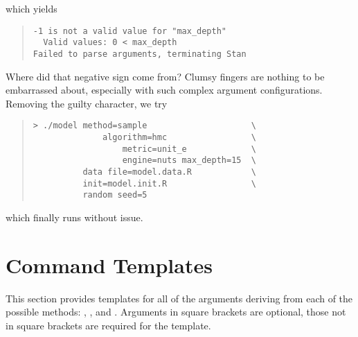 %
which yields
%
\begin{quote}
\begin{Verbatim}
-1 is not a valid value for "max_depth"
  Valid values: 0 < max_depth
Failed to parse arguments, terminating Stan
\end{Verbatim}
\end{quote}
%
Where did that negative sign come from?  Clumsy fingers are nothing
to be embarrassed about, especially with such complex argument
configurations.  Removing the guilty character, we try
%
\begin{quote}
\begin{Verbatim}[fontshape=sl]
> ./model method=sample                     \
              algorithm=hmc                 \
                  metric=unit_e             \
                  engine=nuts max_depth=15  \
          data file=model.data.R            \
          init=model.init.R                 \
          random seed=5
\end{Verbatim}
\end{quote}
%
which finally runs without issue.

\section{Command Templates}

This section provides templates for all of the arguments deriving from
each of the possible methods: , , 
and \code {diagnose}.
Arguments in square brackets are optional,
those not in square brackets are required for the template.

